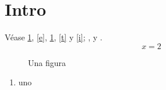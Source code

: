 \documentclass[spanish]{article}
\begin{document}
\section{Intro}\label{s}
Véase \cref{s}, \cref{e}, \cref{f}, \cref{t} y \cref{i}; ,  y .
\begin{equation}x = 2\label{e}\end{equation}
\begin{figure}[h]
\caption{Una figura}\label{f}
\end{figure}
\begin{table}[h]
\caption{Una tabla}\label{t}
\end{table}
\begin{enumerate}
\item uno\label{i}
\end{enumerate}
\end{document}
